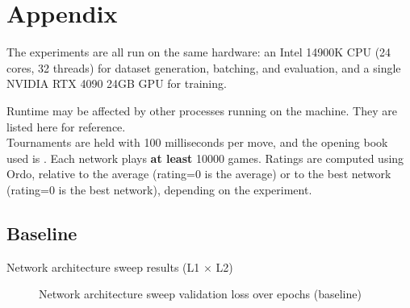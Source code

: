 \appendix

\section{Appendix}

The experiments are all run on the same hardware: an Intel 14900K CPU (24 cores, 32 threads) for dataset generation, batching, and evaluation, and a single NVIDIA RTX 4090 24GB GPU for training.

Runtime may be affected by other processes running on the machine. They are listed here for reference. \\

Tournaments are held with 100 milliseconds per move, and the opening book used is . Each network plays \textbf{at least} 10000 games. Ratings are computed using Ordo, relative to the average (rating=0 is the average) or to the best network (rating=0 is the best network), depending on the experiment. \\

\subsection{Baseline}
\label{appendix:baseline}

\begin{table}[H]
\caption{Network architecture sweep results (L1 $\times$ L2)}
\centering
\begin{adjustbox}{center}

\end{adjustbox}
\end{table}

\begin{figure}[H]
\centering
{}
\caption{Network architecture sweep validation loss over epochs (baseline)}
\end{figure}

